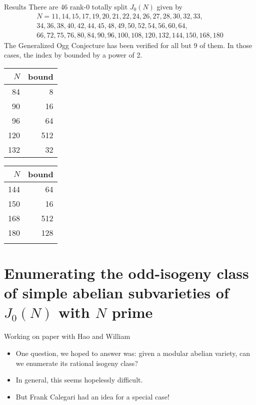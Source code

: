 \documentclass{beamer}
\begin{document}
\begin{frame}{Results}
    There are 46 rank-0 totally split $J_0(N)$ given by 
    \begin{gather*}
        N=11, 14, 15, 17, 19, 20, 21, 22, 24, 26, 27, 28, 30, 32, 33, \\
        34, 36, 38, 40, 42, 44, 45, 48, 49, 50, 52, 54, 56, 60, 64, \\
        66, 72, 75, 76, 80, 84, 90, 96, 100, 108, 120, 132, 144, 150, 168, 180
    \end{gather*}
    The Generalized Ogg Conjecture has been verified for all but 9 of them. In
    those cases, the index by bounded by a power of 2.
\begin{table}%
    \centering
    \begin{tabular}{rr}
        \toprule
        $N$ & bound \\
        \midrule
        84 & 8 \\
        90 & 16 \\
        96 & 64 \\
        120 & 512 \\
        132 & 32 \\
        \bottomrule
    \end{tabular}
    \begin{tabular}{rr}
        \toprule
        $N$ & bound \\
        \midrule
        144 & 64 \\
        150 & 16 \\
        168 & 512 \\
        180 & 128  \\
            &  \\
        \bottomrule
    \end{tabular}
\end{table}
\end{frame}

\section{Enumerating the odd-isogeny class of simple abelian subvarieties of
$J_0(N)$ with $N$ prime}

\begin{frame}{Working on paper with Hao and William}
    \begin{itemize}
        \item
            One question, we hoped to answer was: given a modular abelian
            variety, can we enumerate its rational isogeny class?
            \pause
        \item
            In general, this seems hopelessly difficult.
            \pause
        \item
            But Frank Calegari had an idea for a special case!
    \end{itemize}
\end{frame}
\end{document}

